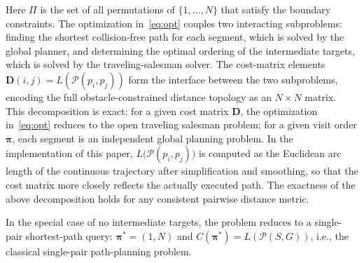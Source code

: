 Here $\Pi$ is the set of all permutations of $\{1, \dots, N\}$ that satisfy the boundary constraints. The optimization in~\textcolor{blue}{\eqref{eq:opt}} couples two interacting subproblems: finding the shortest collision-free path for each segment, which is solved by the global planner, and determining the optimal ordering of the intermediate targets, which is solved by the traveling-salesman solver. The cost-matrix elements $\mathbf{D}(i, j) = L(\mathcal{P}(p_i, p_j))$ form the interface between the two subproblems, encoding the full obstacle-constrained distance topology as an $N \times N$ matrix. This decomposition is exact: for a given cost matrix $\mathbf{D}$, the optimization in~\textcolor{blue}{\eqref{eq:opt}} reduces to the open traveling salesman problem; for a given visit order $\bm{\pi}$, each segment is an independent global planning problem. In the implementation of this paper, $L\big(\mathcal{P}(p_i, p_j)\big)$ is computed as the Euclidean arc length of the continuous trajectory after simplification and smoothing, so that the cost matrix more closely reflects the actually executed path. The exactness of the above decomposition holds for any consistent pairwise distance metric.

In the special case of no intermediate targets, the problem reduces to a single-pair shortest-path query: $\bm{\pi}^{*} = (1, N)$ and $C(\bm{\pi}^{*}) = L(\mathcal{P}(S, G))$, i.e., the classical single-pair path-planning problem.

